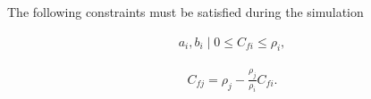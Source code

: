 \documentclass[a4paper,14pt,english]{extreport}
\begin{document}
The following constraints must be satisfied during the simulation

\begin{eqnarray}
\label{eq:angm_fick_concentration_constaints}
a_{i}, b_{i} \mid  \mathit{0} \leq C_{fi} \leq \rho_i,
\end{eqnarray}

\begin{eqnarray}
\label{eq:langm_fick_diffusivity_densities}
C_{fj} =\rho_j -  \frac{\rho_j}{\rho_i}C_{fi}.
\end{eqnarray} 
 
\end{document}
